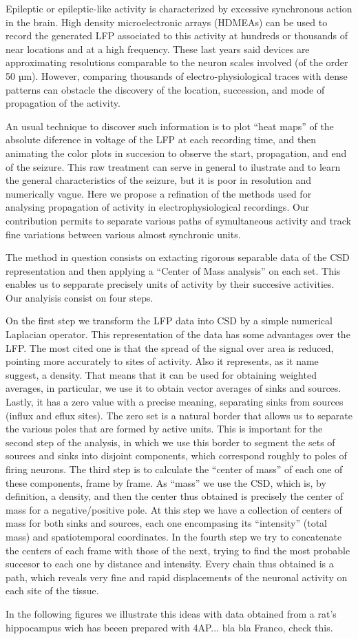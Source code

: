 Epileptic or epileptic-like activity is characterized by excessive synchronous action 
in the brain.  High density microelectronic arrays (HDMEAs) can be used to record
the generated LFP associated to this activity at hundreds or thousands of near
locations and at a  high frequency. These last years said devices are
approximating resolutions comparable to the neuron scales involved (of the
order 50 µm). However, comparing thousands of electro-physiological traces with dense
patterns can obstacle the discovery of the location, succession, and mode of
propagation of the activity.

An usual technique to discover such information is to plot ``heat maps'' of
the absolute diference in voltage of the LFP at each recording time,
and then animating the
color plots in succesion to observe the start, propagation, and end 
of the seizure.  This raw treatment can serve in general to ilustrate and to learn
the general characteristics of the seizure, but it is poor in resolution and
numerically vague. Here we propose a refination of the  methods used for analysing
propagation of activity in electrophysiological recordings. Our contribution permits
to separate various paths of symultaneous activity and track fine variations
between various almost synchronic units.

The method in question consists on extacting rigorous separable data of the CSD
representation and then applying a ``Center of Mass analysis'' on each set. 
This enables us to sepparate precisely units of
activity by their succesive activities. Our analyisis consist on four steps.

On the first step we transform the LFP data into CSD by a simple numerical
Laplacian operator. This representation of the data has some advantages over the LFP.
The most cited one is that the spread of the signal over area is reduced, pointing
more accurately to sites of activity. Also it represents, as it name suggest,
a density. That means that it can be used for obtaining weighted averages,
in particular, we use it to obtain vector averages of sinks and sources. Lastly, it
has a zero value with a precise meaning, separating sinks from sources (influx and
eflux sites). The zero set is a natural border that allows us to separate
the various poles that are formed by active units. This is important for the
second step of the analysis, in which we use this border to segment the sets of
sources and sinks into disjoint components, which correspond roughly to poles
of firing neurons. The third step is to calculate the ``center of mass'' of each
one of these components, frame by frame. As ``mass'' we use the CSD, which is, by
definition, a density, and then the center thus obtained is precisely the center of
mass for a negative/positive pole. At this step we have a collection of centers
of mass for both sinks and sources, each one encompasing its ``intensity'' (total
mass) and spatiotemporal coordinates. In the fourth step we try to concatenate the
centers of each frame with those of the next, trying to find the most probable
succesor to each one by distance and intensity. Every chain thus obtained
is a path, which reveals very fine and rapid displacements of the neuronal activity
on each site of the tissue. 


In the following figures we illustrate this ideas with data obtained from a
rat's hippocampus wich has beeen prepared with 4AP... bla bla Franco, check this.

